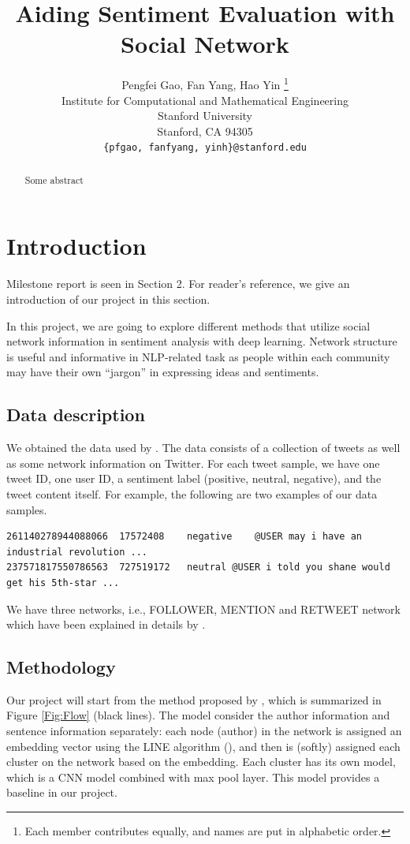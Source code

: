 \documentclass{article} %
\title{Aiding Sentiment Evaluation with Social Network}
\author{
Pengfei Gao, Fan Yang, Hao Yin
\thanks{Each member contributes equally, and names are put in alphabetic order.} \\
Institute for Computational and Mathematical Engineering\\
Stanford University\\
Stanford, CA 94305 \\
\texttt{\{pfgao, fanfyang, yinh\}@stanford.edu}
}
\begin{document}
\maketitle

\begin{abstract}
Some abstract
\end{abstract}

\section{Introduction}
Milestone report is seen in Section 2. For reader's reference, we give an introduction of our project in this section.


In this project, we are going to explore different methods that utilize social network information in sentiment analysis with deep learning. Network structure is useful and informative in NLP-related task as people within each community may have their own ``jargon'' in expressing ideas and sentiments. 


\subsection*{Data description}
We obtained the data used by \cite{yang2017attention}. The data consists of a collection of tweets as well as some network information on Twitter. For each tweet sample, we have one tweet ID, one user ID, a sentiment label (positive, neutral, negative), and the tweet content itself. For example, the following are two examples of our data samples.
\begin{verbatim}
261140278944088066	17572408	negative	@USER may i have an industrial revolution ...
237571817550786563	727519172	neutral	@USER i told you shane would get his 5th-star ...
\end{verbatim}
We have three networks, i.e., FOLLOWER, MENTION and RETWEET network which have been explained in details by
\cite{yang2017attention}.





\subsection*{Methodology}

Our project will start from the method proposed by \cite{yang2017attention}, which is summarized in Figure \ref{Fig:Flow} (black lines). The model consider the author information and sentence information separately: each node (author) in the network is assigned an embedding vector using the LINE algorithm (\cite{tang2015line}), and then is (softly) assigned each cluster on the network based on the embedding. Each cluster has its own model, which is a CNN model combined with max pool layer. This model provides a baseline in our project.
\end{document}
